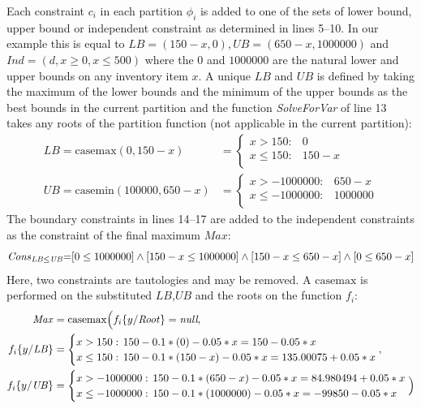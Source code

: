 \documentclass[twoside,11pt]{article}
\newcommand{\casemax}{\mathrm{casemax}}
\newcommand{\casemin}{\mathrm{casemin}}
\newcommand{\UB}{\mathit{UB}}
\newcommand{\LB}{\mathit{LB}}
\newcommand{\IND}{\mathit{Ind}}
\newcommand{\CONS}{\mathit{Cons}}
\newcommand{\Root}{\mathit{Root}}
\newcommand{\Max}{\mathit{Max}}
\newcommand{\sq}{\hspace{-1mm}}
\newcommand{\sqm}{\hspace{-2mm}}
\begin{document}
Each constraint $c_i$ in each partition $\phi_i$ is added to one of the sets of lower bound, upper bound or independent constraint as determined in lines 5--10. In our example this is equal to $\LB = (150 - x, 0) , \UB= (650 - x, 1000000) $ and $\IND=(d,x \geq 0 , x \leq 500) $ where the $0$ and $1000000$ are the natural lower and upper bounds on any inventory item $x$.
A unique $\LB$ and $\UB$ is defined by taking the maximum of the lower bounds and the minimum of the upper bounds as the best bounds in the current partition and the function \emph{SolveForVar} of line 13 takes any roots of the partition function (not applicable in the current partition): 
{%
\begin{align*}
\LB = \casemax(0,150-x) & = \begin{cases}
x > 150: & 0\\ 
x \leq 150: & 150 -x \\ 
\end{cases}\\
\UB = \casemin(100000, 650-x) & = \begin{cases}
x > -1000000: & 650 -x  \\ 
x \leq -1000000: &1000000\\ 
\end{cases}
\end{align*}
}  
The boundary constraints in lines 14--17 are added to the independent constraints as the constraint of the final maximum $\mathit{Max}$:
{\footnotesize 
\begin{equation*}
\CONS_{\LB \leq \UB} \sq = \sq [0 \leq 1000000] %
\land [150 - x \leq 1000000] \land [150-x \leq 650 -x] \land [0 \leq 650 - x] 
\end{equation*}}
Here, two constraints are tautologies and may be removed.
A $\casemax$ is performed on the substituted $\LB$,$\UB$ and the roots on the function $f_i$: 
{\footnotesize 
\begin{align*}
 \Max &= \casemax \Big( f_i \{ y / \Root \} = \textit{null} , \\
 f_i \{ y / \LB \} &= \begin{cases}
x > 150: & \sqm 150 - 0.1 * (0) - 0.05 * x = 150 - 0.05 * x \\ 
x \leq 150:    & \sqm 150 - 0.1 * (150 - x ) - 0.05 * x = 135.00075 + 0.05 * x\\ 
\end{cases},\\
 f_i \{ y / \UB \} &= \begin{cases}
x > -1000000:    & \sqm 150 - 0.1 * (650 -x) - 0.05 * x = 84.980494 + 0.05 * x \\ 
x \leq -1000000: & \sqm 150 - 0.1 * (1000000) - 0.05 * x =  -99850 -0.05 * x\\ 
\end{cases} \Big) 
\end{align*}}
\end{document}
